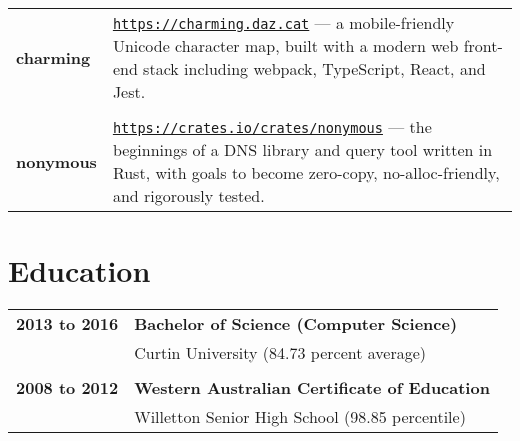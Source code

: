\documentclass[a4paper,12pt]{article}
\begin{document}
\begin{tabular}{p{35mm}p{125mm}}
	                    \textbf{charming}           & \texttt{\href{https://charming.daz.cat}{https://charming.daz.cat}} — a mobile-friendly Unicode character map, built with a modern web front-end stack including webpack, TypeScript, React, and Jest.
	\\              \\  \textbf{nonymous}           & \texttt{\href{https://crates.io/crates/nonymous}{https://crates.io/crates/nonymous}} — the beginnings of a DNS library and query tool written in Rust, with goals to become zero-copy, no-alloc-friendly, and rigorously tested.
\end{tabular}



\newpage

\section*{Education}

\begin{tabular}{p{35mm}p{125mm}}
	                    \textbf{2013 to 2016}       & \textbf{Bachelor of Science (Computer Science)}
	\vspace{0.2em}  \\                              & Curtin University (84.73 percent average)
	\\              \\  \textbf{2008 to 2012}       & \textbf{Western Australian Certificate of Education}
	\vspace{0.2em}  \\                              & Willetton Senior High School (98.85 percentile)
\end{tabular}
\end{document}
